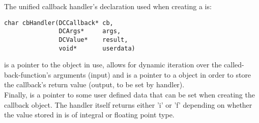 The unified callback handler's declaration used when creating a 
is:

\begin{lstlisting}
char cbHandler(DCCallback* cb,
               DCArgs*     args,
               DCValue*    result,
               void*       userdata)
\end{lstlisting}

 is a pointer to the  object in use,  allows
for dynamic iteration over the called-back-function's arguments (input) and
 is a pointer to a  object in order to store the
callback's return value (output, to be set by handler).\\
Finally,  is a pointer to some user defined data that can be
set when creating the callback object.
The handler itself returns either 'i' or 'f' depending on whether the value
stored in  is of integral or floating point type.

